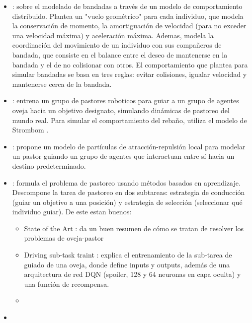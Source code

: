 \documentclass[final]{article}
\begin{document}
\begin{itemize}
    \item \citet{ReynoldsBoids}: sobre el modelado de bandadas a través de un modelo de comportamiento distribuido. Plantea un "vuelo geométrico" para cada
    individuo, que modela la conservación de momento, la amortiguación de velocidad (para no exceder una velocidad máxima) y aceleración máxima. Ademas, modela
    la coordinación del movimiento de un individuo con sus compañeros de bandada, que consiste en el balance entre el deseo de mantenerse en la bandada y el
    de no colisionar con otros. El comportamiento que plantea para simular bandadas se basa en tres reglas: evitar colisiones, igualar velocidad y mantenerse
    cerca de la bandada.
    \item \citet{SankarShepherding}: entrena un grupo de pastores roboticos para guiar a un grupo de agentes oveja hacia un objetivo designato, simulando
    dinámicas de pastoreo del mundo real. Para simular el comportamiento del rebaño, utiliza el modelo de Strombom \citep{Strombom}.
    \item \citet{Strombom}: propone un modelo de partículas de atracción-repulsión local para modelar un pastor guiando un grupo de agentes que interactuan entre
    sí hacia un destino predeterminado.
    \item \citet{NapolitanoShepherding}: formula el problema de pastoreo usando métodos basados en aprendizaje. Descompone la tarea de pastoreo en dos subtareas:
    estrategia de conducción (guiar un objetivo a una posición) y estrategia de selección (seleccionar qué individuo guiar). De este estan buenos:
    \begin{itemize}
        \item State of the Art \citet[cap. I-A]{NapolitanoShepherding}: da un buen resumen de cómo se tratan de resolver los problemas de oveja-pastor
        \item Driving sub-task traint \citet[cap. IV-A]{NapolitanoShepherding}: explica el entrenamiento de la sub-tarea de guiado de una oveja, donde define
        inputs y outputs, además de una arquitectura de red DQN (spoiler, 128 y 64 neuronas en capa oculta) y una función de recompensa.
        \item 
    \end{itemize}
    \item \citet{CovoneShepherding}
\end{itemize}



\end{document}

